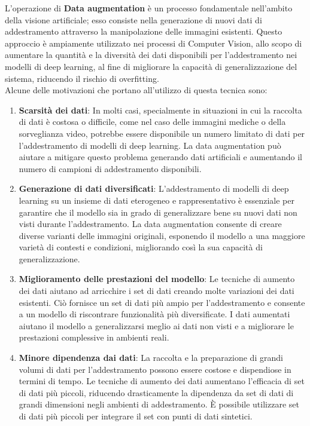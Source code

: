 \documentclass[12pt,a4paper,openright,twoside]{book}
\begin{document}
L'operazione di \textbf{Data augmentation} è un processo fondamentale nell'ambito della visione artificiale; esso consiste nella generazione di nuovi dati di addestramento attraverso la manipolazione delle immagini esistenti. Questo approccio è ampiamente utilizzato nei processi di Computer Vision, allo scopo di aumentare la quantità e la diversità dei dati disponibili per l'addestramento nei modelli di deep learning, al fine di migliorare la capacità di generalizzazione del sistema, riducendo il rischio di overfitting.\\
Alcune delle motivazioni che portano all'utilizzo di questa tecnica sono:
\begin{enumerate}
\item \textbf{Scarsità dei dati}:
In molti casi, specialmente in situazioni in cui la raccolta di dati è costosa o difficile, come nel caso delle immagini mediche o della sorveglianza video, potrebbe essere disponibile un numero limitato di dati per l'addestramento di modelli di deep learning. La data augmentation può aiutare a mitigare questo problema generando dati artificiali e aumentando il numero di campioni di addestramento disponibili.

\item \textbf{Generazione di dati diversificati}:
L'addestramento di modelli di deep learning su un insieme di dati eterogeneo e rappresentativo è essenziale per garantire che il modello sia in grado di generalizzare bene su nuovi dati non visti durante l'addestramento. La data augmentation consente di creare diverse varianti delle immagini originali, esponendo il modello a una maggiore varietà di contesti e condizioni, migliorando così la sua capacità di generalizzazione.

\item \textbf{Miglioramento delle prestazioni del modello}:
Le tecniche di aumento dei dati aiutano ad arricchire i set di dati creando molte variazioni dei dati esistenti. Ciò fornisce un set di dati più ampio per l'addestramento e consente a un modello di riscontrare funzionalità più diversificate. I dati aumentati aiutano il modello a generalizzarsi meglio ai dati non visti e a migliorare le prestazioni complessive in ambienti reali. 

\item \textbf{Minore dipendenza dai dati}:
La raccolta e la preparazione di grandi volumi di dati per l'addestramento possono essere costose e dispendiose in termini di tempo. Le tecniche di aumento dei dati aumentano l'efficacia di set di dati più piccoli, riducendo drasticamente la dipendenza da set di dati di grandi dimensioni negli ambienti di addestramento. È possibile utilizzare set di dati più piccoli per integrare il set con punti di dati sintetici.


\end{enumerate}
\end{document}
